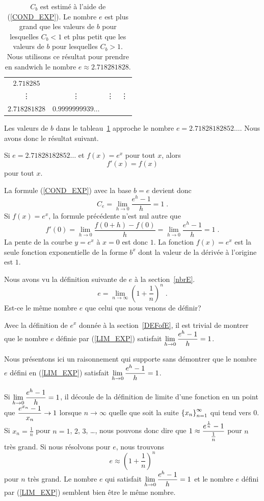 {\begin{table}
{\begin{center}
\begin{tabular}{|c|c|c|l|}
$2.718285$ \\
 \vdots & \vdots & \vdots & \vdots \\
$2.718281828$ & $0.9999999939\ldots$ & & \\
\hline
\end{tabular}
\end{center}
}
\caption[Approximation de $e$]{$C_b$ est estimé à l'aide de (\ref{COND_EXP}).
Le nombre $e$ est plus grand que les valeurs de $b$ pour lesquelles
$C_b<1$ et plus petit que les valeurs de $b$ pour lesquelles $C_b>1$.  Nous
utilisons ce résultat pour prendre en sandwich le nombre
$e \approx 2.718281828$.  \label{TAB_EXP}} 
\end{table}

Les valeurs de $b$ dans le tableau~\ref{TAB_EXP} approche le nombre
$e = 2.71828182852\ldots$.  Nous avons donc le résultat suivant.

\begin{prop}
Si $e = 2.71828182852\ldots$ et $f(x) = e^x$ pour tout $x$, alors
\[
f'(x) = f(x)
\]
pour tout $x$.
\end{prop}

La formule (\ref{COND_EXP}) avec la base $b = e$ devient donc
\[
C_e = \lim_{h\rightarrow 0} \frac{e^h-1}{h} = 1 \;.
\]
Si $f(x) = e^x$, la formule précédente n'est nul autre que
\[
f'(0) = \lim_{h\rightarrow 0} \frac{f(0+h) - f(0)}{h} =
\lim_{h\rightarrow 0} \frac{e^h-1}{h} = 1 \;.
\]
La pente de la courbe $y=e^x$ à $x=0$ est donc $1$.  La fonction
$f(x)=e^x$ est la seule fonction exponentielle de la forme $b^x$ dont
la valeur de la dérivée à l'origine est $1$.

\begin{rmk}
Nous avons vu la définition suivante de $e$ à la section~\ref{nbrE}.
\begin{equation} \label{LIM_EXP}
e = \lim_{n\rightarrow \infty} \left(1+\frac{1}{n}\right)^n \; .
\end{equation}
Est-ce le même nombre $e$ que celui que nous venons de définir?

Avec la définition de $e^x$ donnée à la section~\ref{DEFofE}, il est
trivial de montrer que le nombre $e$ définie par (\ref{LIM_EXP})
satisfait $\displaystyle \lim_{h\rightarrow 0} \frac{e^h-1}{h} = 1$.

Nous présentons ici un raisonnement qui supporte sans démontrer que le
nombre $e$ défini en (\ref{LIM_EXP}) satisfait
$\displaystyle \lim_{h\rightarrow 0} \frac{e^h-1}{h} = 1$.

Si $\displaystyle \lim_{h\rightarrow 0} \frac{e^h-1}{h} = 1$, il
découle de la définition de limite d'une fonction en un point que
$\displaystyle \frac{e^{x_n}-1}{x_n} \rightarrow 1$ lorsque
$n \rightarrow \infty$ quelle que soit la suite
$\displaystyle \left\{x_n\right\}_{n=1}^\infty$ qui tend vers $0$.  Si
$x_n = \frac{1}{n}$ pour $n=1$, $2$, $3$, \ldots, nous pouvons donc dire que
$\displaystyle 1 \approx \frac{e^{\frac{1}{n}}-1}{\frac{1}{n}}$
pour $n$ très grand.  Si nous résolvons pour $e$, nous trouvons
\[
e \approx \left(1 + \frac{1}{n}\right)^n
\]
pour $n$ très grand.  Le nombre $e$ qui satisfait
$\displaystyle \lim_{h\rightarrow 0} \frac{e^h-1}{h} = 1$ et le nombre
$e$ défini par (\ref{LIM_EXP}) semblent bien être le même nombre.


\end{rmk}}
